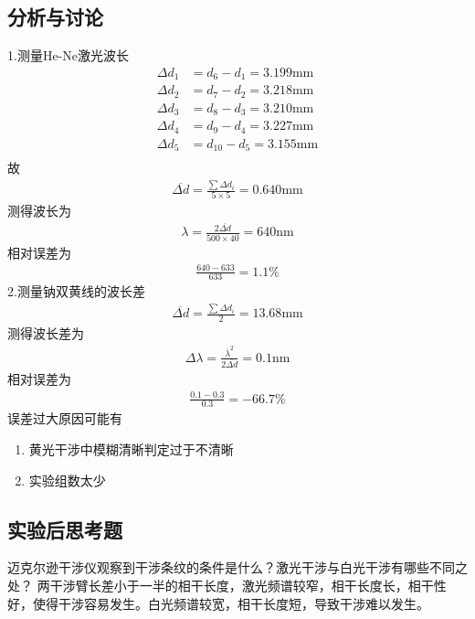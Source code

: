 \documentclass[dvipsnames, svgnames,a4paper,11pt]{article}
\begin{document}
\subsection{分析与讨论}
1.测量He-Ne激光波长
\begin{align*}
	\Delta d_1&=d_6-d_1=3.199\text{mm}\\
	\Delta d_2&=d_7-d_2=3.218\text{mm}\\
	\Delta d_3&=d_8-d_3=3.210\text{mm}\\
	\Delta d_4&=d_9-d_4=3.227\text{mm}\\
	\Delta d_5&=d_10-d_5=3.155\text{mm}\\
\end{align*}
故
\begin{align*}
	\overline{\Delta d}=\frac{\sum \Delta d_i}{5\times 5}=0.640\text{mm}
\end{align*}
测得波长为
\begin{align*}
	\lambda=\frac{2\overline{\Delta d}}{500\times 40}=640\text{nm}
\end{align*}
相对误差为
\begin{align*}
	\frac{640-633}{633}=1.1\%
\end{align*}
2.测量钠双黄线的波长差
\begin{align*}
	\overline{\Delta d}=\frac{\sum \Delta d_i}{2}=13.68\text{mm}
\end{align*}
测得波长差为
\begin{align*}
	\Delta \lambda=\frac{\overline{\lambda}^2}{2\overline{\Delta d}}=0.1\text{nm}
\end{align*}
相对误差为
\begin{align*}
	\frac{0.1-0.3}{0.3}=-66.7\%
\end{align*}
误差过大原因可能有
\begin{enumerate}
	\item 黄光干涉中模糊清晰判定过于不清晰
	\item 实验组数太少
\end{enumerate}
\subsection{实验后思考题}
\begin{question}
	迈克尔逊干涉仪观察到干涉条纹的条件是什么？激光干涉与白光干涉有哪些不同之处？
	\tcblower
	两干涉臂长差小于一半的相干长度，激光频谱较窄，相干长度长，相干性好，使得干涉容易发生。白光频谱较宽，相干长度短，导致干涉难以发生。
\end{question}
\end{document}

